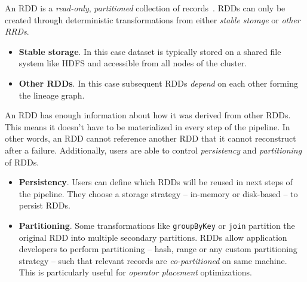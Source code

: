 An RDD is a \emph{read-only}, \emph{partitioned} collection of records~\cite{Zaharia:2012}. RDDs can only be created through deterministic transformations from either \emph{stable storage} or \emph{other RRDs}.
\begin{itemize}
    \item \textbf{Stable storage}. In this case dataset is typically stored on a shared file system like HDFS and accessible from all nodes of the cluster.
    \item \textbf{Other RDDs}. In this case subsequent RDDs \emph{depend} on each other forming the lineage graph.
\end{itemize}
An RDD has enough information about how it was derived from other RDDs. This means it doesn't have to be materialized in every step of the pipeline. In other words, an RDD cannot reference another RDD that it cannot reconstruct after a failure. Additionally, users are able to control \emph{persistency} and \emph{partitioning} of RDDs.
\begin{itemize}
    \item \textbf{Persistency}. Users can define which RDDs will be reused in next steps of the pipeline. They choose a storage strategy -- in-memory or disk-based -- to persist RDDs.
    \item \textbf{Partitioning}. Some transformations like \lstinline$groupByKey$ or \lstinline$join$ partition the original RDD into multiple secondary partitions. RDDs allow application developers to perform partitioning -- hash, range or any custom partitioning strategy -- such that relevant records are \emph{co-partitioned} on same machine. This is particularly useful for \emph{operator placement} optimizations.
\end{itemize}

